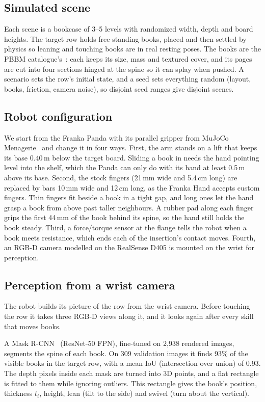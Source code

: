 \documentclass{article}
\begin{document}
\subsection{Simulated scene}
Each scene is a bookcase of 3--5 levels with randomized width, depth and board heights. The target row
holds free-standing books, placed and then settled by physics so leaning and touching books are in real
resting poses. The books are the PBBM catalogue's~\citep{sygo2023pbbm}: each keeps its size, mass and
textured cover, and its pages are cut into four sections hinged at the spine so it can splay when pushed.
A scenario sets the row's initial state, and a seed sets everything random (layout, books, friction,
camera noise), so disjoint seed ranges give disjoint scenes.

\subsection{Robot configuration}
We start from the Franka Panda with its parallel gripper from MuJoCo Menagerie~\citep{menagerie2022} and
change it in four ways. First, the arm stands on a lift that keeps its base 0.40\,m below the target board.
Sliding a book in needs the hand pointing level into the shelf, which the Panda can only do with its hand
at least 0.5\,m above its base. Second, the stock fingers (21\,mm wide and 5.4\,cm long) are replaced by bars
10\,mm wide and 12\,cm long, as the Franka Hand accepts custom fingers. Thin fingers fit beside a book in a
tight gap, and long ones let the hand grasp a book from above past taller neighbours. A rubber pad along
each finger grips the first 44\,mm of the book behind its spine, so the hand still holds the book steady. Third, a force/torque sensor at the flange tells the robot when a book meets resistance, which
ends each of the insertion's contact moves. Fourth, an RGB-D camera modelled on the RealSense D405 is
mounted on the wrist for perception.

\subsection{Perception from a wrist camera}
The robot builds its picture of the row from the wrist camera. Before touching the row it takes three
RGB-D views along it, and it looks again after every skill that moves books.

A Mask R-CNN~\citep{he2017maskrcnn} (ResNet-50 FPN), fine-tuned on 2{,}938 rendered images, segments the
spine of each book. On 309 validation images it finds 93\% of the visible books in the target row, with a
mean IoU (intersection over union) of 0.93. The depth pixels inside each mask are turned into 3D points, and a flat rectangle is
fitted to them while ignoring outliers. This rectangle gives the book's position, thickness $t_i$, height,
lean (tilt to the side) and swivel (turn about the vertical).
\end{document}
